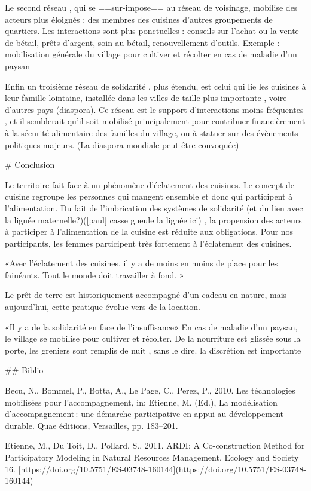 Le second réseau , qui se ==sur-impose== au réseau de voisinage,  mobilise des acteurs plus éloignés : des  membres des cuisines d'autres groupements de quartiers. 
Les interactions sont plus ponctuelles : conseils sur l'achat ou la vente de bétail, prêts d'argent, soin au bétail, renouvellement d'outils. Exemple : mobilisation générale du village pour cultiver et récolter en cas de maladie d'un paysan 


Enfin un troisième réseau de solidarité , plus étendu, est celui qui lie les cuisines à leur famille lointaine, installée dans les villes  de taille plus importante , voire d'autres pays (diaspora).
Ce réseau est le support d'interactions  moins fréquentes , et il semblerait qu'il soit mobilisé principalement pour contribuer financièrement à la sécurité alimentaire des familles du village, ou à statuer sur des évènements politiques majeurs. (La diaspora mondiale peut être convoquée)

# Conclusion

Le territoire fait face à un phénomène d’éclatement des cuisines. Le concept de cuisine regroupe les personnes qui mangent ensemble et donc qui participent à l’alimentation. Du fait de l’imbrication des systèmes de solidarité (et du lien avec la lignée maternelle?)([paul] casse gueule la lignée ici) , la propension des acteurs à participer à l’alimentation de la cuisine est réduite aux obligations. Pour nos participants, les femmes participent très fortement à l’éclatement des cuisines.

«Avec l’éclatement des cuisines, il y a de moins en moins de place pour les fainéants. Tout le monde doit travailler à fond. »


Le prêt de terre est historiquement accompagné d’un cadeau en nature, mais aujourd’hui, cette pratique évolue vers de la location.

«Il y a de la solidarité en face de l’insuffisance»
En cas de maladie d’un paysan, le village se mobilise pour cultiver et récolter.
De la nourriture est glissée sous la porte, les greniers sont remplis de nuit , sans le dire.
la discrétion est importante


## Biblio

Becu, N., Bommel, P., Botta, A., Le Page, C., Perez, P., 2010. Les téchnologies mobilisées pour l’accompagnement, in: Etienne, M. (Ed.), La modélisation d’accompagnement : une démarche participative en appui au développement durable. Quae éditions, Versailles, pp. 183–201.

Etienne, M., Du Toit, D., Pollard, S., 2011. ARDI: A Co-construction Method for Participatory Modeling in Natural Resources Management. Ecology and Society 16. [https://doi.org/10.5751/ES-03748-160144](https://doi.org/10.5751/ES-03748-160144)

